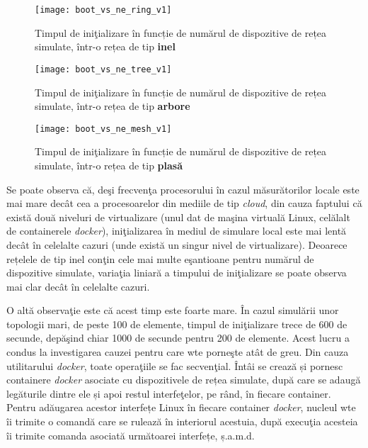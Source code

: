 \begin{figure}[hp]
	\centering
	\texttt{[image: boot\_vs\_ne\_ring\_v1]}
	\caption{Timpul de iniţializare în funcție de numărul de dispozitive de rețea simulate, într-o rețea de tip \textbf{inel}}
	\label{fig:boot_vs_ne_ring_v1}
\end{figure}

\begin{figure}[hp]
	\centering
	\texttt{[image: boot\_vs\_ne\_tree\_v1]}
	\caption{Timpul de iniţializare în funcție de numărul de dispozitive de rețea simulate, într-o rețea de tip \textbf{arbore}}
	\label{fig:boot_vs_ne_tree_v1}
\end{figure}

\begin{figure}[hp]
	\centering
	\texttt{[image: boot\_vs\_ne\_mesh\_v1]}
	\caption{Timpul de iniţializare în funcție de numărul de dispozitive de rețea simulate, într-o rețea de tip \textbf{plasă}}
	\label{fig:boot_vs_ne_mesh_v1}
\end{figure}

Se poate observa că, deşi frecvenţa procesorului în cazul măsurătorilor locale este mai mare decât cea a procesoarelor din mediile de tip \textit{cloud}, din cauza faptului că există două niveluri de virtualizare (unul dat de maşina virtuală Linux, celălalt de containerele \textit{docker}), iniţializarea în mediul de simulare local este mai lentă decât în celelalte cazuri (unde există un singur nivel de virtualizare). Deoarece rețelele de tip inel conţin cele mai multe eşantioane pentru numărul de dispozitive simulate, variaţia liniară a timpului de iniţializare se poate observa mai clar decât în celelalte cazuri.

O altă observaţie este că acest timp este foarte mare. În cazul simulării unor topologii mari, de peste 100 de elemente, timpul de iniţializare trece de 600 de secunde, depăşind chiar 1000 de secunde pentru 200 de elemente. Acest lucru a condus la investigarea cauzei pentru care \gls{wte} porneşte atât de greu. Din cauza utilitarului \textit{docker}, toate operaţiile se fac secvenţial. Întâi se crează și pornesc containere \textit{docker} asociate cu dispozitivele de rețea simulate, după care se adaugă legăturile dintre ele și apoi restul interfeţelor, pe rând, în fiecare container. Pentru adăugarea acestor interfețe Linux în fiecare container \textit{docker}, nucleul \gls{wte} îi trimite o comandă care se rulează în interiorul acestuia, după execuţia acesteia îi trimite comanda asociată următoarei interfețe, ș.a.m.d.


